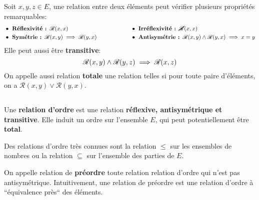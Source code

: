 \subsection*{}

Soit \(x, y, z \in E\), une relation entre deux éléments peut vérifier plusieurs propriétés remarquables:
\[
    \begin{aligned}
        &\bullet \textbf{ Réflexivité : } \mathscr{R}(x, x)\\
        &\bullet \textbf{ Symétrie : } \mathscr{R}(x, y) \implies \mathscr{R}(y, x)\\
    \end{aligned}
    \hspace{60pt}
    \begin{aligned}
        &\bullet \textbf{ Irréflexivité : } \cancel{\mathscr{R}}(x, x)\\
        &\bullet \textbf{ Antisymétrie : } \mathscr{R}(x, y) \land \mathscr{R}(y, x) \implies x = y \\
    \end{aligned}
\]
Elle peut aussi être \textbf{transitive}:
\[
    \mathscr{R}(x, y) \land \mathscr{R}(y, z) \implies \mathscr{R}(x, z)\\
\]
On appelle aussi relation \textbf{totale} une relation telles si pour toute paire d'éléments, on a \(\mathscr{R}(x, y) \lor \mathscr{R}(y, x)\).
\pagebreak
\subsection*{}

Une \textbf{relation d'ordre} est une relation \textbf{réflexive, antisymétrique et transitive}. Elle induit un ordre sur l'ensemble \(E\), qui peut potentiellement être \textbf{total}.\<

Des relations d'ordre très connues sont la relation \(\leq\) sur les ensembles de nombres ou la relation \(\subseteq\) sur l'ensemble des parties de \(E\).\<

On appelle relation de \textbf{préordre} toute relation relation d'ordre qui n'est pas antisymétrique. Intuitivement, une relation de préordre est une relation d'ordre à ``équivalence près`` des éléments.
\subsection*{}

